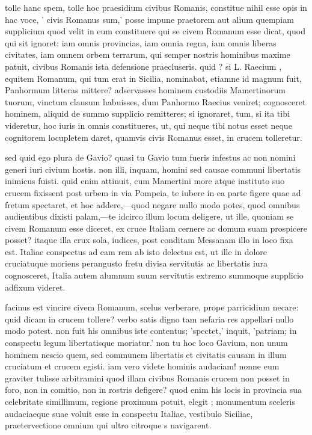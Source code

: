  tolle hanc spem, tolle hoc praesidium civibus Romanis, constitue nihil esse opis in hac voce, ' civis Romanus sum,' posse impune praetorem aut alium quempiam supplicium quod velit in eum constituere qui se civem Romanum esse dicat, quod qui sit ignoret: iam omnis provincias, iam omnia regna, iam omnis liberas civitates, iam omnem orbem terrarum, qui semper nostris hominibus maxime patuit, civibus Romanis ista defensione praecluseris. quid ? si L. Raecium , equitem Romanum, qui tum erat in Sicilia, nominabat, etiamne id magnum fuit, Panhormum litteras mittere? adservasses hominem custodiis Mamertinorum tuorum, vinctum clausum habuisses, dum Panhormo Raecius veniret; cognosceret hominem, aliquid de summo supplicio remitteres; si ignoraret, tum, si ita tibi videretur, hoc iuris in omnis constitueres, ut, qui neque tibi notus esset neque cognitorem locupletem daret, quamvis civis Romanus esset, in crucem tolleretur.

 sed quid ego plura de Gavio? quasi tu Gavio tum fueris infestus ac non nomini generi iuri civium hostis. non illi, inquam, homini sed causae communi libertatis inimicus fuisti. quid enim attinuit, cum Mamertini more atque instituto suo crucem fixissent post urbem in via Pompeia, te iubere in ea parte figere quae ad fretum spectaret, et hoc addere,—quod negare nullo modo potes, quod omnibus audientibus dixisti palam,—te idcirco illum locum deligere, ut ille, quoniam se civem Romanum esse diceret, ex cruce Italiam cernere ac domum suam prospicere posset? itaque illa crux sola, iudices, post conditam Messanam illo in loco fixa est. Italiae conspectus ad eam rem ab isto delectus est, ut ille in dolore cruciatuque moriens perangusto fretu divisa servitutis ac libertatis iura cognosceret, Italia autem alumnum suum servitutis extremo summoque supplicio adfixum videret.

 facinus est vincire civem Romanum, scelus verberare, prope parricidium necare: quid dicam in crucem tollere? verbo satis digno tam nefaria res appellari nullo modo potest. non fuit his omnibus iste contentus; 'spectet,' inquit, 'patriam; in conspectu legum libertatisque moriatur.' non tu hoc loco Gavium, non unum hominem nescio quem, sed communem libertatis et civitatis causam in illum cruciatum et crucem egisti. iam vero videte hominis audaciam! nonne eum graviter tulisse arbitramini quod illam civibus Romanis crucem non posset in foro, non in comitio, non in rostris defigere? quod enim his locis in provincia sua celebritate simillimum, regione proximum potuit, elegit ; monumentum sceleris audaciaeque suae voluit esse in conspectu Italiae, vestibulo Siciliae, praetervectione omnium qui ultro citroque s navigarent.

